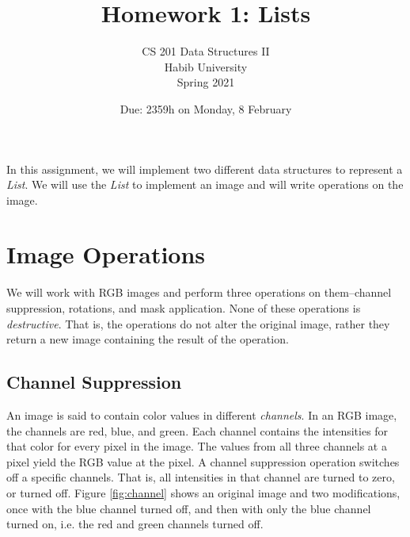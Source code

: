 \documentclass[addpoints]{exam}
\title{Homework 1: Lists}
\author{CS 201 Data Structures II\\Habib University\\Spring 2021}
\date{Due: 2359h on Monday, 8 February}
\begin{document}
\maketitle

In this assignment, we will implement two different data structures to represent a \textit{List}. We will use the \textit{List} to implement an image and will write operations on the image.

\section{Image Operations}
\label{sec:imgops}

We will work with RGB images and perform three operations on them--channel suppression, rotations, and mask application. None of these operations is \textit{destructive}. That is, the operations do not alter the original image, rather they return a new image containing the result of the operation.

\subsection{Channel Suppression}

An image is said to contain color values in different \textit{channels}. In an RGB image, the channels are red, blue, and green. Each channel contains the intensities for that color for every pixel in the image. The values from all three channels at a pixel yield the RGB value at the pixel. A channel suppression operation switches off a specific channels. That is, all intensities in that channel are turned to zero, or turned off. Figure \ref{fig:channel} shows an original image and two modifications, once with the blue channel turned off, and then with only the blue channel turned on, i.e. the red and green channels turned off.
\end{document}
